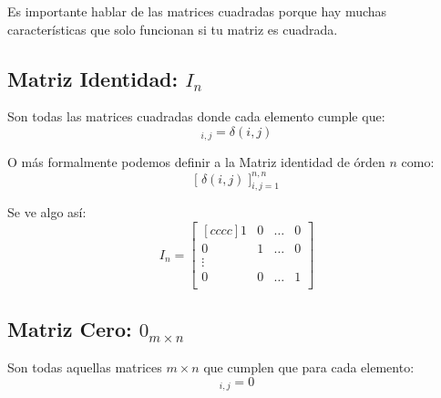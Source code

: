 \documentclass[12pt, fleqn]{report}                             %
\theoremstyle{break}                                            %
\newcommand{\BigBrackets}[1]{\Big[ \; #1 \; \Big]}              %
\begin{document}
                Es importante hablar de las matrices cuadradas porque hay muchas
                características que solo funcionan si tu matriz es cuadrada.



            \clearpage
            \subsection{Matriz Identidad: $I_n$}

                Son todas las matrices cuadradas donde cada elemento cumple que:
                \begin{equation*}
                    [I]_{i, j} = \delta(i, j)
                \end{equation*}

                O más formalmente podemos definir a la Matriz identidad de órden $n$ como:
                \begin{equation*}
                    \BigBrackets{\delta(i,j)}_{i, j = 1}^{n, n}
                \end{equation*}

                Se ve algo así:
                \begin{equation*}
                    I_n =
                    \begin{bmatrix}[cccc]
                        1 & 0 & \dots & 0   \\
                        0 & 1 & \dots & 0   \\
                        \vdots              \\
                        0 & 0 & \dots & 1   \\
                    \end{bmatrix}
                \end{equation*}



            \vspace{2em}
            \subsection{Matriz Cero: $0_{m \times n}$}

                Son todas aquellas matrices $m \times n$ que cumplen que para cada elemento:
                \begin{equation*}
                    [0]_{i,j} = 0
                \end{equation*}
\end{document}
